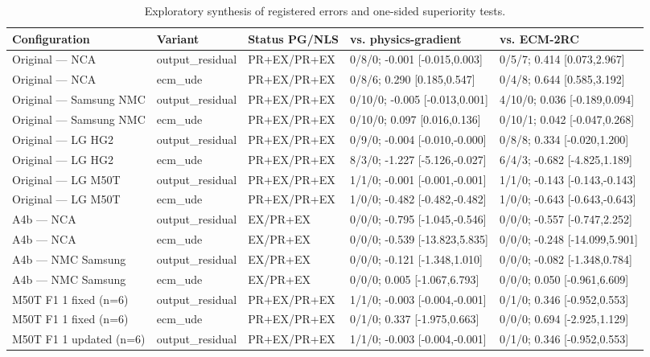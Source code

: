 \begin{table}[t]
\centering
\footnotesize
\setlength{\tabcolsep}{2pt}
\caption{Exploratory synthesis of registered errors and one-sided superiority tests.}
\label{tab:reviewer-round2-synthesis}
\begin{tabular}{lllll}
\toprule
Configuration & Variant & Status PG/NLS & vs. physics-gradient & vs. ECM-2RC \\
\midrule
Original — NCA & output\_residual & PR+EX/PR+EX & 0/8/0; -0.001 [-0.015,0.003] & 0/5/7; 0.414 [0.073,2.967] \\
Original — NCA & ecm\_ude & PR+EX/PR+EX & 0/8/6; 0.290 [0.185,0.547] & 0/4/8; 0.644 [0.585,3.192] \\
Original — Samsung NMC & output\_residual & PR+EX/PR+EX & 0/10/0; -0.005 [-0.013,0.001] & 4/10/0; 0.036 [-0.189,0.094] \\
Original — Samsung NMC & ecm\_ude & PR+EX/PR+EX & 0/10/0; 0.097 [0.016,0.136] & 0/10/1; 0.042 [-0.047,0.268] \\
Original — LG HG2 & output\_residual & PR+EX/PR+EX & 0/9/0; -0.004 [-0.010,-0.000] & 0/8/8; 0.334 [-0.020,1.200] \\
Original — LG HG2 & ecm\_ude & PR+EX/PR+EX & 8/3/0; -1.227 [-5.126,-0.027] & 6/4/3; -0.682 [-4.825,1.189] \\
Original — LG M50T & output\_residual & PR+EX/PR+EX & 1/1/0; -0.001 [-0.001,-0.001] & 1/1/0; -0.143 [-0.143,-0.143] \\
Original — LG M50T & ecm\_ude & PR+EX/PR+EX & 1/0/0; -0.482 [-0.482,-0.482] & 1/0/0; -0.643 [-0.643,-0.643] \\
A4b — NCA & output\_residual & EX/PR+EX & 0/0/0; -0.795 [-1.045,-0.546] & 0/0/0; -0.557 [-0.747,2.252] \\
A4b — NCA & ecm\_ude & EX/PR+EX & 0/0/0; -0.539 [-13.823,5.835] & 0/0/0; -0.248 [-14.099,5.901] \\
A4b — NMC Samsung & output\_residual & EX/PR+EX & 0/0/0; -0.121 [-1.348,1.010] & 0/0/0; -0.082 [-1.348,0.784] \\
A4b — NMC Samsung & ecm\_ude & EX/PR+EX & 0/0/0; 0.005 [-1.067,6.793] & 0/0/0; 0.050 [-0.961,6.609] \\
M50T F1 1 fixed (n=6) & output\_residual & PR+EX/PR+EX & 1/1/0; -0.003 [-0.004,-0.001] & 0/1/0; 0.346 [-0.952,0.553] \\
M50T F1 1 fixed (n=6) & ecm\_ude & PR+EX/PR+EX & 0/1/0; 0.337 [-1.975,0.663] & 0/0/0; 0.694 [-2.925,1.129] \\
M50T F1 1 updated (n=6) & output\_residual & PR+EX/PR+EX & 1/1/0; -0.003 [-0.004,-0.001] & 0/1/0; 0.346 [-0.952,0.553] \\

\end{tabular}
\end{table}
